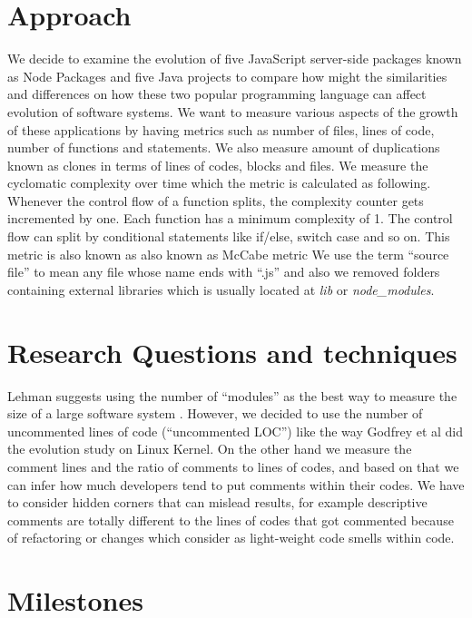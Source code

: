 \documentclass[conference]{IEEEtran}
\begin{document}
	
	\section{Approach}
	\label{sec:approach}
We decide to examine the evolution of five JavaScript server-side packages known as Node Packages and five Java projects to compare how might the similarities and differences on how these two popular programming language can affect evolution of software systems. 
We want to measure various aspects of the growth of these applications by having metrics such as number of files, lines of code, number of functions and statements. We also measure amount of duplications known as clones in terms of lines of codes, blocks and files. We measure the cyclomatic complexity over time which the metric is calculated as following. Whenever the control flow of a function splits, the complexity counter gets incremented by one. Each function has a minimum complexity of 1. The control flow can split by conditional statements like if/else, switch case and so on. This metric is also known as also known as McCabe metric
We use the term “source file” to mean any file whose name ends with “.js” and also we removed folders containing external libraries which is usually located at \textit{lib} or \textit{node\_modules}. 
	
	\section{Research Questions and techniques}
	Lehman suggests using the number of “modules” as the best way to measure the size of a large software system \cite{637156}. However, we decided to use the number of uncommented lines of code (“uncommented LOC”) like the way Godfrey et al \cite{883030} did the evolution study on Linux Kernel. On the other hand we measure the comment lines and the ratio of comments to lines of codes, and based on that we can infer how much developers tend to put comments within their codes. We have to consider hidden corners that can mislead results, for example descriptive comments are totally different to the lines of codes that got commented because of refactoring or changes which consider as light-weight code smells within code.
	

	
	
	\label{sec:rq}
	
	\section{Milestones}
	
	
	
\end{document}

